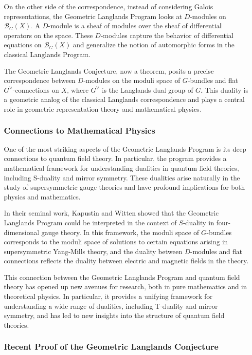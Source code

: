 \documentclass{article}
\theoremstyle{remark}
\begin{document}
On the other side of the correspondence, instead of considering Galois representations, the Geometric Langlands Program looks at $D$-modules on $\mathcal{B}_G(X)$. A $D$-module is a sheaf of modules over the sheaf of differential operators on the space. These $D$-modules capture the behavior of differential equations on $\mathcal{B}_G(X)$ and generalize the notion of automorphic forms in the classical Langlands Program.

The Geometric Langlands Conjecture, now a theorem, posits a precise correspondence between $D$-modules on the moduli space of $G$-bundles and flat $G^\vee$-connections on $X$, where $G^\vee$ is the Langlands dual group of $G$. This duality is a geometric analog of the classical Langlands correspondence and plays a central role in geometric representation theory and mathematical physics.

\subsubsection{Connections to Mathematical Physics}

One of the most striking aspects of the Geometric Langlands Program is its deep connections to quantum field theory. In particular, the program provides a mathematical framework for understanding dualities in quantum field theories, including S-duality and mirror symmetry. These dualities arise naturally in the study of supersymmetric gauge theories and have profound implications for both physics and mathematics.

In their seminal work, Kapustin and Witten showed that the Geometric Langlands Program could be interpreted in the context of $S$-duality in four-dimensional gauge theory. In this framework, the moduli space of $G$-bundles corresponds to the moduli space of solutions to certain equations arising in supersymmetric Yang-Mills theory, and the duality between $D$-modules and flat connections reflects the duality between electric and magnetic fields in the theory.

This connection between the Geometric Langlands Program and quantum field theory has opened up new avenues for research, both in pure mathematics and in theoretical physics. In particular, it provides a unifying framework for understanding a wide range of dualities, including T-duality and mirror symmetry, and has led to new insights into the structure of quantum field theories.

\subsubsection{Recent Proof of the Geometric Langlands Conjecture}
\end{document}
